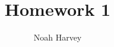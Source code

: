 \documentclass[a4paper,titlepage]{article}
\begin{document}
	\title{Homework 1}
	\author{Noah Harvey}
	\maketitle

	

\end{document}
